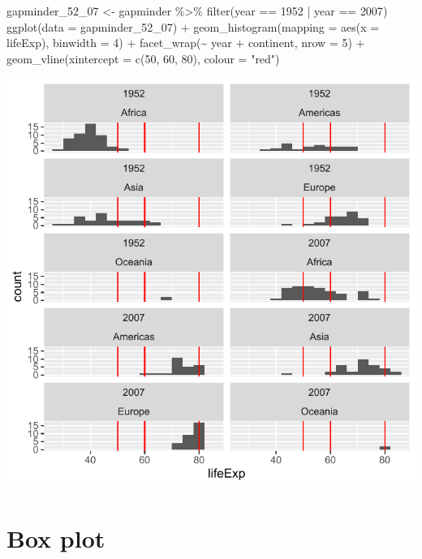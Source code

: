 \documentclass[
]{book}
\makeatletter
\newenvironment{Shaded}{\begin{snugshade}}{\end{snugshade}}
\newcommand{\AttributeTok}[1]{\textcolor[rgb]{0.61,0.61,0.61}{#1}}
\newcommand{\DecValTok}[1]{\textcolor[rgb]{0.06,0.06,0.06}{#1}}
\newcommand{\FunctionTok}[1]{\textcolor[rgb]{0,0,0}{#1}}
\newcommand{\NormalTok}[1]{#1}
\newcommand{\OtherTok}[1]{\textcolor[rgb]{0.37,0.37,0.37}{#1}}
\newcommand{\SpecialCharTok}[1]{\textcolor[rgb]{0,0,0}{#1}}
\newcommand{\StringTok}[1]{\textcolor[rgb]{0.5,0.5,0.5}{#1}}
\newenvironment{kframe}{%
\medskip{}
\setlength{\fboxsep}{.8em}
 \def\at@end@of@kframe{}%
 \ifinner\ifhmode%
  \def\at@end@of@kframe{\end{minipage}}%
  \begin{minipage}{\columnwidth}%
 \fi\fi%
 \def\FrameCommand##1{\hskip\@totalleftmargin \hskip-\fboxsep
 \colorbox{shadecolor}{##1}\hskip-\fboxsep
     \hskip-\linewidth \hskip-\@totalleftmargin \hskip\columnwidth}%
 \MakeFramed {\advance\hsize-\width
   \@totalleftmargin\z@ \linewidth\hsize
   \@setminipage}}%
 {\par\unskip\endMakeFramed%
 \at@end@of@kframe}
\renewenvironment{Shaded}{\begin{kframe}}{\end{kframe}}
\makeatother
\begin{document}
\begin{Shaded}
\begin{Highlighting}[]
\NormalTok{gapminder\_52\_07 }\OtherTok{\textless{}{-}}\NormalTok{ gapminder }\SpecialCharTok{\%\textgreater{}\%} \FunctionTok{filter}\NormalTok{(year }\SpecialCharTok{==} \DecValTok{1952} \SpecialCharTok{|}\NormalTok{ year }\SpecialCharTok{==} \DecValTok{2007}\NormalTok{)}
\FunctionTok{ggplot}\NormalTok{(}\AttributeTok{data =}\NormalTok{ gapminder\_52\_07) }\SpecialCharTok{+}
  \FunctionTok{geom\_histogram}\NormalTok{(}\AttributeTok{mapping =} \FunctionTok{aes}\NormalTok{(}\AttributeTok{x =}\NormalTok{ lifeExp), }\AttributeTok{binwidth =} \DecValTok{4}\NormalTok{) }\SpecialCharTok{+} 
  \FunctionTok{facet\_wrap}\NormalTok{(}\SpecialCharTok{\textasciitilde{}}\NormalTok{ year }\SpecialCharTok{+}\NormalTok{ continent, }\AttributeTok{nrow =} \DecValTok{5}\NormalTok{) }\SpecialCharTok{+}
  \FunctionTok{geom\_vline}\NormalTok{(}\AttributeTok{xintercept =} \FunctionTok{c}\NormalTok{(}\DecValTok{50}\NormalTok{, }\DecValTok{60}\NormalTok{, }\DecValTok{80}\NormalTok{), }\AttributeTok{colour =} \StringTok{"red"}\NormalTok{) }
\end{Highlighting}
\end{Shaded}

\begin{center}\includegraphics[width=0.7\linewidth,keepaspectratio]{Multivariable_Data_Analysis_files/figure-latex/unnamed-chunk-83-1} \end{center}

\hypertarget{box-plot}{%
\section{Box plot}\label{box-plot}}
\end{document}
